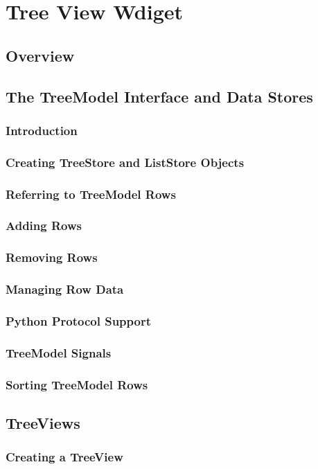 \chapter{Tree View Wdiget}
\section{Overview}
\section{The TreeModel Interface and Data Stores}
\subsection{Introduction}
\subsection{Creating TreeStore and ListStore Objects}
\subsection{Referring to TreeModel Rows}
\subsection{Adding Rows}
\subsection{Removing Rows}
\subsection{Managing Row Data}
\subsection{Python Protocol Support}
\subsection{TreeModel Signals}
\subsection{Sorting TreeModel Rows}
\section{TreeViews}
\subsection{Creating a TreeView}
